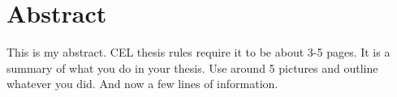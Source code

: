 \chapter*{Abstract}
This is my abstract.
CEL thesis rules require it to be about 3-5 pages. 
It is a summary of what you do in your thesis.
Use around 5 pictures and outline whatever you did.
And now a few lines of information.


